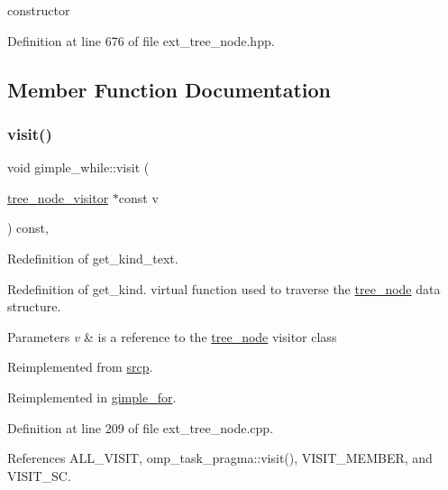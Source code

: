 constructor 



Definition at line 676 of file ext\+\_\+tree\+\_\+node.\+hpp.



\subsection{Member Function Documentation}
\mbox{\label{structgimple__while_a8fbe7b677d626e16026d600db417ef32}} 
\subsubsection{\texorpdfstring{visit()}{visit()}}
{\footnotesize\ttfamily void gimple\+\_\+while\+::visit (\begin{DoxyParamCaption}\item[{\hyperlink{classtree__node__visitor}{tree\+\_\+node\+\_\+visitor} $\ast$const}]{v }\end{DoxyParamCaption}) const\hspace{0.3cm}{\ttfamily [override]}, {\ttfamily [virtual]}}



Redefinition of get\+\_\+kind\+\_\+text. 

Redefinition of get\+\_\+kind. virtual function used to traverse the \hyperlink{classtree__node}{tree\+\_\+node} data structure. 
\begin{DoxyParams}{Parameters}
{\em v} & is a reference to the \hyperlink{classtree__node}{tree\+\_\+node} visitor class \\
\hline
\end{DoxyParams}


Reimplemented from \hyperlink{structsrcp_a1cd5943380f069e6ed0a33566af2566d}{srcp}.



Reimplemented in \hyperlink{structgimple__for_a582c8e3f0d70da9d0c1e8365eb56836d}{gimple\+\_\+for}.



Definition at line 209 of file ext\+\_\+tree\+\_\+node.\+cpp.



References A\+L\+L\+\_\+\+V\+I\+S\+IT, omp\+\_\+task\+\_\+pragma\+::visit(), V\+I\+S\+I\+T\+\_\+\+M\+E\+M\+B\+ER, and V\+I\+S\+I\+T\+\_\+\+SC.

